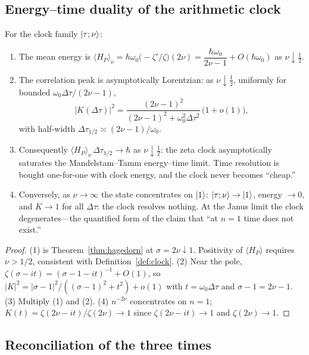 \subsection{Energy--time duality of the arithmetic clock}

\begin{proposition}\label{prop:uncertainty}
For the clock family $\lvert \tau;\nu\rangle$:
\begin{enumerate}[leftmargin=1.6em]
\item The mean energy is
$\langle H_{P}\rangle_{\nu}=\hbar\omega_{0}\bigl(-\zeta'/\zeta\bigr)(2\nu)
=\dfrac{\hbar\omega_{0}}{2\nu-1}+O(\hbar\omega_{0})$ as $\nu\downarrow\tfrac12$.
\item The correlation peak is asymptotically Lorentzian: as $\nu\downarrow\tfrac12$,
uniformly for bounded $\omega_{0}\Delta\tau/(2\nu-1)$,
\begin{equation}
|K(\Delta\tau)|^{2}
=\frac{(2\nu-1)^{2}}{(2\nu-1)^{2}+\omega_{0}^{2}\Delta\tau^{2}}\,\bigl(1+o(1)\bigr),
\end{equation}
with half-width $\Delta\tau_{1/2}\asymp(2\nu-1)/\omega_{0}$.
\item Consequently $\langle H_{P}\rangle_{\nu}\,\Delta\tau_{1/2}\to\hbar$ as
$\nu\downarrow\tfrac12$: the zeta clock asymptotically saturates the
Mandelstam--Tamm energy--time limit. Time resolution is bought one-for-one with clock energy,
and the clock never becomes ``cheap.''
\item Conversely, as $\nu\to\infty$ the state concentrates on $\lvert 1\rangle$:
$\lvert \tau;\nu\rangle\to\lvert 1\rangle$, energy $\to0$, and $K\to1$ for all $\Delta\tau$: the clock
resolves nothing. At the Janus limit the clock degenerates---the quantified form of the
claim that ``at $n=1$ time does not exist.''
\end{enumerate}
\end{proposition}

\begin{proof}
(1) is Theorem~\ref{thm:hagedorn} at $\sigma=2\nu\downarrow1$. Positivity of $\langle H_P\rangle$ requires $\nu>1/2$, consistent with Definition~\ref{def:clock}. (2) Near the pole,
$\zeta(\sigma-it)=(\sigma-1-it)^{-1}+O(1)$, so
$|K|^{2}=|\sigma-1|^{2}/((\sigma-1)^{2}+t^{2})+o(1)$ with $t=\omega_{0}\Delta\tau$ and
$\sigma-1=2\nu-1$. (3) Multiply (1) and (2). (4) $n^{-2\nu}$ concentrates on $n=1$;
$K(t)=\zeta(2\nu-it)/\zeta(2\nu)\to1$ since $\zeta(2\nu-it)\to1$ and
$\zeta(2\nu)\to1$.
\end{proof}

\subsection{Reconciliation of the three times}

